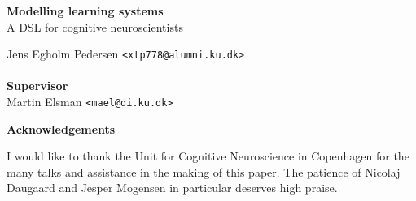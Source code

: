 \documentclass[a4paper,oneside]{memoir}
\begin{document}
    \thispagestyle{empty}
    \begin{adjustwidth}{-3cm}{-1.5cm}
    \vspace*{2.5cm}
    \textbf{\Huge Modelling learning systems} \\
    \vspace*{.8cm}
    {\huge  A DSL for cognitive neuroscientists}\\
    \begin{tabbing}
    Jens Egholm Pedersen \hspace{1cm} \= \texttt{<xtp778@alumni.ku.dk>} \\
    \\[11cm]

    \textbf{\Large Supervisor} \\
    Martin Elsman \hspace{1cm} \texttt{<mael@di.ku.dk>}
    \end{tabbing}
    \end{adjustwidth}

    \newpage

    \ClearWallPaper

\renewcommand\cftchapteraftersnumb{\normalfont}
\renewcommand\cftbeforechapterskip{5pt plus 1pt}

\vspace*{\fill}
\begin{center}
\textbf{Acknowledgements}
\end{center}
\begin{center}
\begin{minipage}{.8\textwidth}

I would like to thank the Unit for Cognitive Neuroscience in Copenhagen for
the many talks and assistance in the making of this paper. The patience of
Nicolaj Daugaard and Jesper Mogensen in particular deserves high praise.
\end{minipage}
\end{center}
\vfill

\newpage

\frontmatter
\tableofcontents*
\newpage
\end{document}
